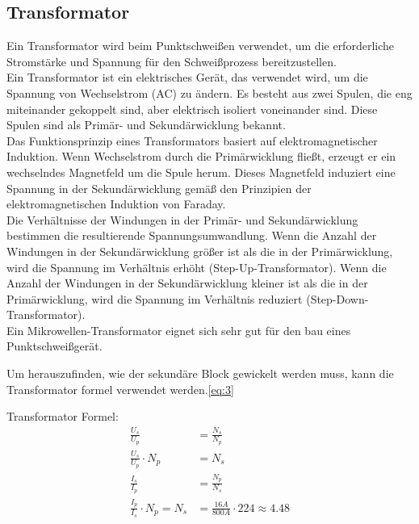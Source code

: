 

\subsection*{ Transformator}

Ein Transformator wird beim Punktschweißen verwendet, um die erforderliche Stromstärke und Spannung für den Schweißprozess bereitzustellen.\\

Ein Transformator ist ein elektrisches Gerät, das verwendet wird, um die Spannung von Wechselstrom (AC) zu ändern.
Es besteht aus zwei Spulen, die eng miteinander gekoppelt sind, aber elektrisch isoliert voneinander sind.
Diese Spulen sind als Primär- und Sekundärwicklung bekannt.\\


Das Funktionsprinzip eines Transformators basiert auf elektromagnetischer Induktion.
Wenn Wechselstrom durch die Primärwicklung fließt, erzeugt er ein wechselndes Magnetfeld um die Spule herum.
Dieses Magnetfeld induziert eine Spannung in der Sekundärwicklung gemäß den Prinzipien der elektromagnetischen Induktion von Faraday.\\


Die Verhältnisse der Windungen in der Primär- und Sekundärwicklung bestimmen die resultierende Spannungsumwandlung.
Wenn die Anzahl der Windungen in der Sekundärwicklung größer ist als die in der Primärwicklung, wird die Spannung im Verhältnis erhöht (Step-Up-Transformator).
Wenn die Anzahl der Windungen in der Sekundärwicklung kleiner ist als die in der Primärwicklung, wird die Spannung im Verhältnis reduziert (Step-Down-Transformator).\\



Ein Mikrowellen-Transformator eignet sich sehr gut für den bau eines Punktschweißgerät.


Um herauszufinden, wie der sekundäre Block gewickelt werden muss, kann die Transformator formel verwendet werden.\ref{eq:3}

Transformator Formel:
\begin{align}%
        \frac{U_s}{U_p} &= \frac{N_s}{N_p}\\
        \frac{U_s}{U_p}\cdot N_p &= N_s \\
        \frac{I_s}{I_p} &=\frac{N_p}{N_s}\\
        \frac{I_p}{I_s} \cdot N_p = N_s &= \frac{16A}{800A}\cdot 224 \approx 4.48
        \label{eq:3}
\end{align}
        
